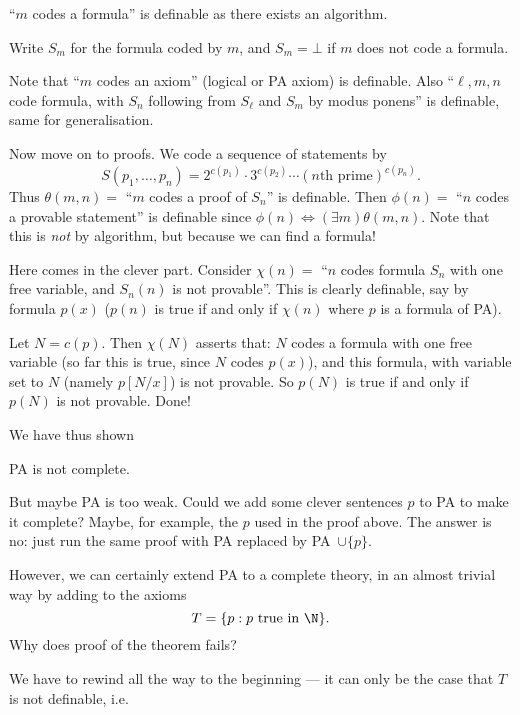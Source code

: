 \documentclass[a4paper]{article}
\begin{document}
``\(m\) codes a formula'' is definable as there exists an algorithm.

\begin{notation}
  Write \(S_m\) for the formula coded by \(m\), and \(S_m = \bot\) if \(m\) does not code a formula.
\end{notation}

Note that ``\(m\) codes an axiom'' (logical or PA axiom) is definable. Also ``\(\ell, m, n\) code formula, with \(S_n\) following from \(S_\ell\) and \(S_m\) by modus ponens'' is definable, same for generalisation.

Now move on to proofs. We code a sequence of statements by
\[
  S(p_1, \dots, p_n) = 2^{c(p_1)} \cdot 3^{c(p_2)} \cdots (n\text{th prime})^{c(p_n)}.
\]
Thus \(\theta(m, n) = \) ``\(m\) codes a proof of \(S_n\)'' is definable. Then \(\phi(n) = \) ``\(n\) codes a provable statement'' is definable since \(\phi(n) \iff (\exists m) \theta(m, n)\). Note that this is \emph{not} by algorithm, but because we can find a formula!

Here comes in the clever part. Consider \(\chi(n) = \) ``\(n\) codes formula \(S_n\) with one free variable, and \(S_n(n)\) is not provable''. This is clearly definable, say by formula \(p(x)\) (\(p(n)\) is true if and only if \(\chi(n)\) where \(p\) is a formula of PA).

Let \(N = c(p)\). Then \(\chi(N)\) asserts that: \(N\) codes a formula with one free variable (so far this is true, since \(N\) codes \(p(x)\)), and this formula, with variable set to \(N\) (namely \(p[N/x]\)) is not provable. So \(p(N)\) is true if and only if \(p(N)\) is not provable. Done!

We have thus shown

\begin{theorem}
  PA is not complete.
\end{theorem}

But maybe PA is too weak. Could we add some clever sentences \(p\) to PA to make it complete? Maybe, for example, the \(p\) used in the proof above. The answer is no: just run the same proof with PA replaced by PA~\(\cup \{p\}\).

However, we can certainly extend PA to a complete theory, in an almost trivial way by adding to the axioms
\[
  T = \{p: p \text{ true in } \N\}.
\]
Why does proof of the theorem fails?

We have to rewind all the way to the beginning --- it can only be the case that \(T\) is not definable, i.e.
\end{document}
